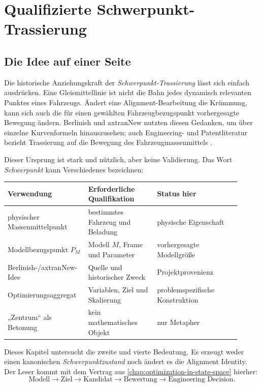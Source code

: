 \chapter{Qualifizierte Schwerpunkt-Trassierung}

\section*{Die Idee auf einer Seite}

Die historische Anziehungskraft der \emph{Schwerpunkt-Trassierung} lässt sich
einfach ausdrücken. Eine Gleismittellinie ist nicht die Bahn jedes dynamisch
relevanten Punktes eines Fahrzeugs. Ändert eine Alignment-Bearbeitung die
Krümmung, kann sich auch die für einen gewählten Fahrzeugbezugspunkt
vorhergesagte Bewegung ändern. Berlinish und axtranNew nutzten diesen Gedanken,
um über einzelne Kurvenformeln hinauszusehen; auch Engineering- und
Patentliteratur bezieht Trassierung auf die Bewegung des Fahrzeugmassenmittels
\cite{Hasslinger2002Schwerpunkt}.

Dieser Ursprung ist stark und nützlich, aber keine Validierung. Das Wort
\emph{Schwerpunkt} kann Verschiedenes bezeichnen:

\begin{center}
\small
\begin{tabular}{p{0.29\linewidth}p{0.28\linewidth}p{0.34\linewidth}}
\toprule
Verwendung & Erforderliche Qualifikation & Status hier\\
\midrule
physischer Massenmittelpunkt & bestimmtes Fahrzeug und Beladung & physische Eigenschaft\\
Modellbezugspunkt \(P_M\) & Modell \(M\), Frame und Parameter & vorhergesagte Modellgröße\\
Berlinish-/axtranNew-Idee & Quelle und historischer Zweck & Projektprovenienz\\
Optimierungsaggregat & Variablen, Ziel und Skalierung & problemspezifische Konstruktion\\
„Zentrum“ als Betonung & kein mathematisches Objekt & nur Metapher\\
\bottomrule
\end{tabular}
\end{center}

Dieses Kapitel untersucht die zweite und vierte Bedeutung. Es erzeugt weder
einen kanonischen \emph{Schwerpunktzustand} noch ändert es die Alignment
Identity. Der Leser kommt mit dem Vertrag aus
\cref{chap:optimization-in-state-space} hierher:
\[
\text{Modell}\to\text{Ziel}\to\text{Kandidat}
\to\text{Bewertung}\to\text{Engineering Decision}.
\]

